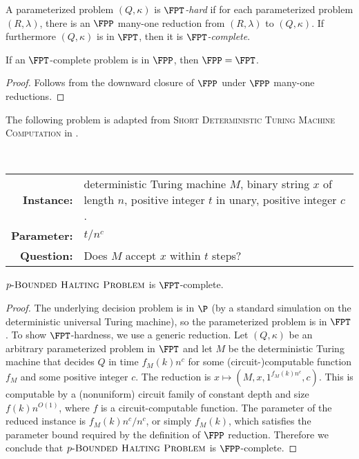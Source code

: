 \documentclass{article}
\newcommand{\dash}{\textnormal{-}}
\begin{document}
\begin{definition}
  A parameterized problem $(Q, \kappa)$ is \emph{$\FPT$-hard} if for each parameterized problem $(R, \lambda)$, there is an $\FPP$ many-one reduction from $(R, \lambda)$ to $(Q, \kappa)$.
  If furthermore $(Q, \kappa)$ is in $\FPT$, then it is \emph{$\FPT$-complete}.
\end{definition}

\begin{proposition}
  If an $\FPT$-complete problem is in $\FPP$, then $\FPP = \FPT$.
\end{proposition}
\begin{proof}
  Follows from the downward closure of $\FPP$ under $\FPP$ many-one reductions.
\end{proof}

The following problem is adapted from \textsc{Short Deterministic Turing Machine Computation} in \autocite{cesati06}.

\begin{definition}[{$p\dash\textsc{Bounded Halting Problem}$}]
  \mbox{} \\
  \begin{tabular}{r p{9.2cm}}
    \textbf{Instance:} & deterministic Turing machine $M$, binary string $x$ of length $n$, positive integer $t$ in unary, positive integer $c$. \\
    \textbf{Parameter:} & $t / n^c$ \\
    \textbf{Question:} & Does $M$ accept $x$ within $t$ steps?
  \end{tabular}
\end{definition}

\begin{theorem}
  $p \dash \textsc{Bounded Halting Problem}$ is $\FPT$-complete.
\end{theorem}
\begin{proof}
  The underlying decision problem is in $\P$ (by a standard simulation on the deterministic universal Turing machine), so the parameterized problem is in $\FPT$.
  To show $\FPT$-hardness, we use a generic reduction.
  Let $(Q, \kappa)$ be an arbitrary parameterized problem in $\FPT$ and let $M$ be the deterministic Turing machine that decides $Q$ in time $f_M(k) n^c$ for some (circuit-)computable function $f_M$ and some positive integer $c$.
  The reduction is $x \mapsto (M, x, 1^{f_M(k) n^c}, c)$.
  This is computable by a (nonuniform) circuit family of constant depth and size $f(k) n^{O(1)}$, where $f$ is a circuit-computable function.
  The parameter of the reduced instance is $f_M(k) n^c / n^c$, or simply $f_M(k)$, which satisfies the parameter bound required by the definition of $\FPP$ reduction.
  Therefore we conclude that $p \dash \textsc{Bounded Halting Problem}$ is $\FPP$-complete.
\end{proof}
\end{document}
